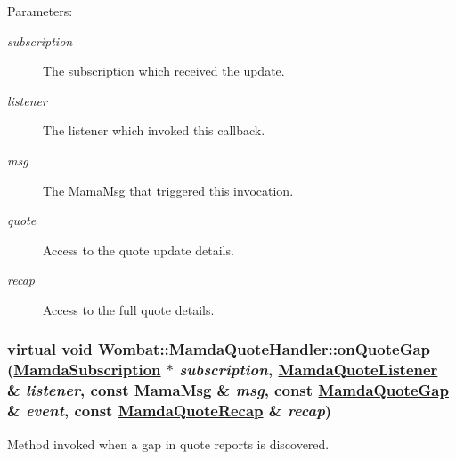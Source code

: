 \begin{Desc}
\item[Parameters:]
\begin{description}
\item[{\em subscription}]The subscription which received the update. \item[{\em listener}]The listener which invoked this callback. \item[{\em msg}]The Mama\-Msg that triggered this invocation. \item[{\em quote}]Access to the quote update details. \item[{\em recap}]Access to the full quote details. \end{description}
\end{Desc}
\hypertarget{classWombat_1_1MamdaQuoteHandler_6fa51f8243ef1a46825813c02c4f05f1}{
\subsubsection[onQuoteGap]{\setlength{\rightskip}{0pt plus 5cm}virtual void Wombat::Mamda\-Quote\-Handler::on\-Quote\-Gap (\hyperlink{classWombat_1_1MamdaSubscription}{Mamda\-Subscription} $\ast$ {\em subscription}, \hyperlink{classWombat_1_1MamdaQuoteListener}{Mamda\-Quote\-Listener} \& {\em listener}, const Mama\-Msg \& {\em msg}, const \hyperlink{classWombat_1_1MamdaQuoteGap}{Mamda\-Quote\-Gap} \& {\em event}, const \hyperlink{classWombat_1_1MamdaQuoteRecap}{Mamda\-Quote\-Recap} \& {\em recap})}}
\label{classWombat_1_1MamdaQuoteHandler_6fa51f8243ef1a46825813c02c4f05f1}


Method invoked when a gap in quote reports is discovered. 

